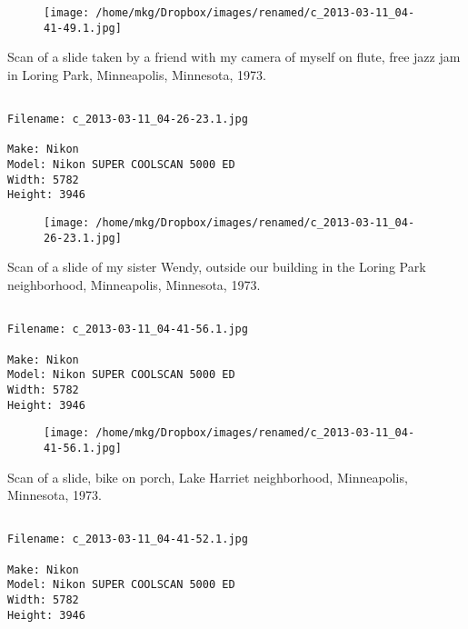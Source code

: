 \begin{figure}
\texttt{[image: /home/mkg/Dropbox/images/renamed/c\_2013-03-11\_04-41-49.1.jpg]}
\end{figure}
    
\clearpage
\onecolumn
\noindent Scan of a slide taken by a friend with my camera of myself on flute, free jazz jam in Loring Park, Minneapolis, Minnesota, 1973.
\noindent
\begin{lstlisting}

Filename: c_2013-03-11_04-26-23.1.jpg

Make: Nikon
Model: Nikon SUPER COOLSCAN 5000 ED
Width: 5782
Height: 3946
\end{lstlisting}
\clearpage

\begin{figure}
\texttt{[image: /home/mkg/Dropbox/images/renamed/c\_2013-03-11\_04-26-23.1.jpg]}
\end{figure}
    
\clearpage
\onecolumn
\noindent Scan of a slide of my sister Wendy, outside our building in the Loring Park neighborhood, Minneapolis, Minnesota, 1973.
\noindent
\begin{lstlisting}

Filename: c_2013-03-11_04-41-56.1.jpg

Make: Nikon
Model: Nikon SUPER COOLSCAN 5000 ED
Width: 5782
Height: 3946
\end{lstlisting}
\clearpage

\begin{figure}
\texttt{[image: /home/mkg/Dropbox/images/renamed/c\_2013-03-11\_04-41-56.1.jpg]}
\end{figure}
    
\clearpage
\onecolumn
\noindent Scan of a slide, bike on porch, Lake Harriet neighborhood, Minneapolis, Minnesota, 1973.
\noindent
\begin{lstlisting}

Filename: c_2013-03-11_04-41-52.1.jpg

Make: Nikon
Model: Nikon SUPER COOLSCAN 5000 ED
Width: 5782
Height: 3946
\end{lstlisting}
\clearpage

